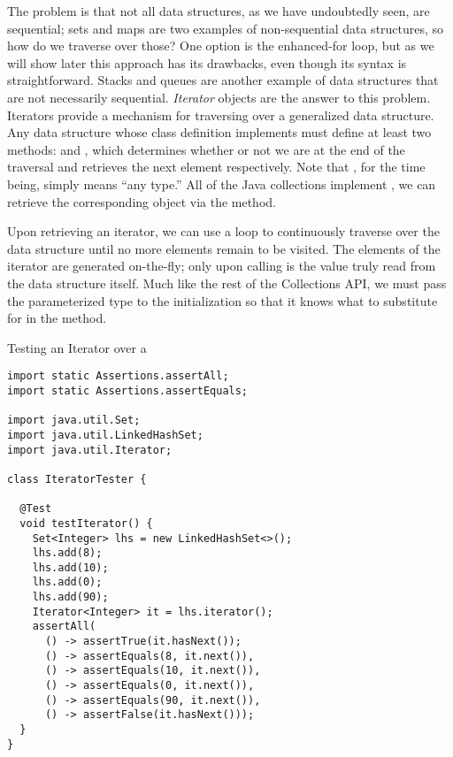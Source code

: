 The problem is that not all data structures, as we have undoubtedly seen, are sequential; sets and maps are two examples of non-sequential data structures, so how do we traverse over those? One option is the enhanced-for loop, but as we will show later this approach has its drawbacks, even though its syntax is straightforward. Stacks and queues are another example of data structures that are not necessarily sequential. \textit{Iterator} objects are the answer to this problem. Iterators provide a mechanism for traversing over a generalized data structure. Any data structure whose class definition implements  must define at least two methods:  and , which determines whether or not we are at the end of the traversal and retrieves the next element respectively. Note that , for the time being, simply means ``any type.'' All of the Java collections implement , we can retrieve the corresponding  object via the  method. 

Upon retrieving an iterator, we can use a  loop to continuously traverse over the data structure until no more elements remain to be visited. The elements of the iterator are generated on-the-fly; only upon calling  is the value truly read from the data structure itself. Much like the rest of the Collections API, we must pass the parameterized type to the  initialization so that it knows what to substitute for  in the  method.


\begin{cl}[]{Testing an Iterator over a }
\begin{lstlisting}[language=MyJava]
import static Assertions.assertAll;
import static Assertions.assertEquals;

import java.util.Set;
import java.util.LinkedHashSet;
import java.util.Iterator;

class IteratorTester {

  @Test
  void testIterator() {
    Set<Integer> lhs = new LinkedHashSet<>();
    lhs.add(8);
    lhs.add(10);
    lhs.add(0);
    lhs.add(90);
    Iterator<Integer> it = lhs.iterator();
    assertAll(
      () -> assertTrue(it.hasNext());
      () -> assertEquals(8, it.next()),
      () -> assertEquals(10, it.next()),
      () -> assertEquals(0, it.next()),
      () -> assertEquals(90, it.next()),
      () -> assertFalse(it.hasNext()));
  }
} 
\end{lstlisting}
\end{cl}

